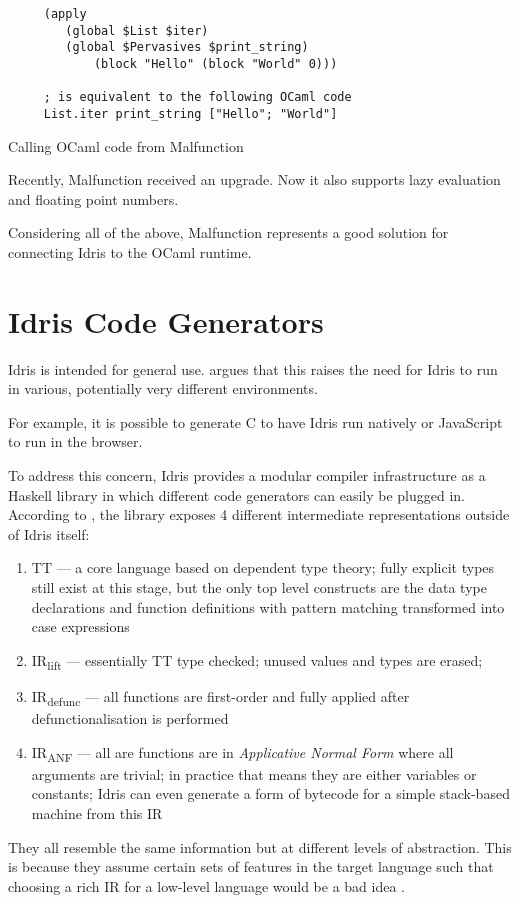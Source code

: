 \begin{listing}
    \begin{verbatim}
     (apply
        (global $List $iter)
        (global $Pervasives $print_string)
            (block "Hello" (block "World" 0)))

     ; is equivalent to the following OCaml code
     List.iter print_string ["Hello"; "World"]
  \end{verbatim}
    \caption{Calling OCaml code from Malfunction}
    \label{lst:mlfforeign}
\end{listing}

% 

Recently, Malfunction received an upgrade.
Now it also supports lazy evaluation and
floating point numbers.

Considering all of the above, Malfunction represents a good
solution for connecting Idris to the OCaml runtime.

\section{Idris Code Generators}
Idris is intended for general use. \citep{crosscompilers} argues
that this raises the need for Idris to run in various, potentially
very different environments.

For example, it is possible to generate C to have Idris run
natively or JavaScript to run in the browser.

To address this concern, Idris provides a modular compiler
infrastructure as a Haskell library in which different code
generators can easily be plugged in.
According to \citep{crosscompilers},
the library exposes 4 different intermediate representations outside
of Idris itself:
\begin{enumerate}
    \item TT --- a core language based on dependent type theory; fully
          explicit types still exist at this stage, but the only top level
          constructs are the data type declarations and function definitions
          with pattern matching transformed into case expressions
    \item IR\textsubscript{lift} --- essentially TT type checked; unused values
          and types are erased;
    \item IR\textsubscript{defunc} --- all functions are first-order
          and fully applied after defunctionalisation is performed
    \item IR\textsubscript{ANF} --- all are functions are in
          \emph{Applicative Normal Form} where all arguments are trivial;
          in practice that means they are either variables or constants;
          Idris can even generate a form of bytecode for a simple
          stack-based machine from this IR
\end{enumerate}
They all resemble the same information but at different levels
of abstraction. This is because they assume certain sets of features
in the target language such that choosing a rich IR
for a low-level language would be a bad idea
\citep{ElliottIdrisErlang}.


